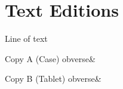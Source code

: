 \documentclass{memoir}
\begin{document}
\appendix
\chapter{Text Editions}\label{app:editions}

Line of text

\begin{pairs}
\begin{Leftside}
\beginnumbering
\begin{astanza}
\skipnumbering Copy A (Case) obverse\&
\end{astanza}
\endnumbering
\end{Leftside}
\begin{Rightside}
\beginnumbering
\begin{astanza}
\skipnumbering Copy B (Tablet) obverse\&
\end{astanza}
\endnumbering
\end{Rightside}
\end{pairs}
\Columns
\end{document}
